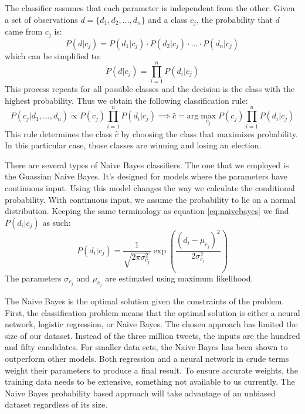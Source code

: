 \documentclass[11pt, twoside, reqno]{book}
\begin{document}
The classifier assumes that each parameter is independent from the other. Given a set of observations $d = \{d_1, d_2, \dots, d_n\}$ and a class $c_j$, the probability that $d$ came from $c_j$ is:
\begin{equation}
\label{eq:naivebayes}
P(d|c_j) = P(d_1|c_j) \cdot P(d_2|c_j) \cdot \ldots \cdot P(d_n|c_j)
\end{equation}
which can be simplified to:
\begin{equation}
\label{eq:simnaivebayes}
P(d|c_j) = \prod^{n}_{i=1} P(d_i|c_j)
\end{equation}
This process repeats for all possible classes and the decision is the class with the highest probability. Thus we obtain the following classification rule:
\begin{equation}
\label{eq:classrule}
P(c_j | d_1,\dots,d_n) \propto P(c_j) \prod^{n}_{i=1} P(d_i | c_j) \implies \hat{c} = \text{arg}\max_{c_j}P(c_j)\prod^{n}_{i=1}P(d_i | c_j)
\end{equation}
This rule determines the class $\hat{c}$ by choosing the class that maximizes probability. In this particular case, those classes are winning and losing an election. 

There are several types of Naive Bayes classifiers. The one that we employed is the Guassian Naive Bayes. It's designed for models where the parameters have continuous input. Using this model changes the way we calculate the conditional probability. With continuous input, we assume the probability to lie on a normal distribution. Keeping the same terminology as equation \ref{eq:naivebayes} we find $P(d_i | c_j)$ as such:
\begin{equation}
\label{eq:gaussprob}
P(d_i | c_j) = \dfrac{1}{\sqrt{2\pi\sigma^{2}_{c_j}}}\exp\left(\dfrac{(d_i - \mu_{c_j})^2}{2\sigma^{2}_{c_j}}\right)
\end{equation}
The parameters $\sigma_{c_j}$ and $\mu_{c_j}$ are estimated using maximum likelihood. 

The Naive Bayes is the optimal solution given the constraints of the problem. First, the classification problem means that the optimal solution is either a neural network, logistic regression, or Naive Bayes. The chosen approach has limited the size of our dataset. Instead of the three million tweets, the inputs are the hundred and fifty candidates. For smaller data sets, the Naive Bayes has been shown to outperform other models\cite{zhang2004,hand2001idiot}. Both regression and a neural network in crude terms weight their parameters to produce a final result. To ensure accurate weights, the training data needs to be extensive, something not available to us currently. The Naive Bayes probability based approach will take advantage of an unbiased dataset regardless of its size. 
\end{document}
